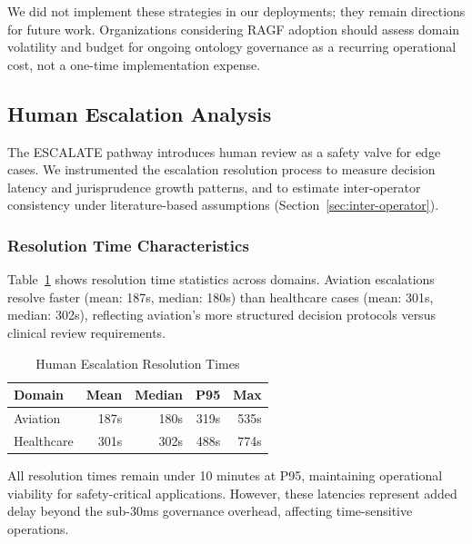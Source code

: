 \documentclass[sigconf,nonacm]{acmart}
\begin{document}
We did not implement these strategies in our deployments; they remain directions for future work. Organizations considering RAGF adoption should assess domain volatility and budget for ongoing ontology governance as a recurring operational cost, not a one-time implementation expense.


\subsection{Human Escalation Analysis}

The ESCALATE pathway introduces human review as a safety valve for edge cases.
We instrumented the escalation resolution process to measure decision latency
and jurisprudence growth patterns, and to estimate inter-operator consistency
under literature-based assumptions (Section~\ref{sec:inter-operator}).

\subsubsection{Resolution Time Characteristics}

Table~\ref{tab:resolution-times} shows resolution time statistics across domains.
Aviation escalations resolve faster (mean: 187s, median: 180s) than healthcare
cases (mean: 301s, median: 302s), reflecting aviation's more structured decision
protocols versus clinical review requirements.

\begin{table}[h]
\centering
\caption{Human Escalation Resolution Times}
\label{tab:resolution-times}
\begin{tabular}{lrrrr}
\toprule
\textbf{Domain} & \textbf{Mean} & \textbf{Median} & \textbf{P95} & \textbf{Max} \\
\midrule
Aviation   & 187s & 180s & 319s & 535s \\
Healthcare & 301s & 302s & 488s & 774s \\
\bottomrule
\end{tabular}
\end{table}

All resolution times remain under 10 minutes at P95, maintaining operational
viability for safety-critical applications. However, these latencies represent
added delay beyond the sub-30ms governance overhead, affecting time-sensitive
operations.
\end{document}
